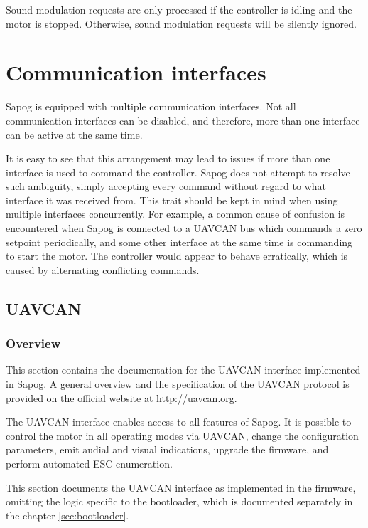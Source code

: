 \documentclass{zubaxdoc}
\begin{document}
Sound modulation requests are only processed if the controller is idling and the motor is stopped.
Otherwise, sound modulation requests will be silently ignored.

\chapter{Communication interfaces}\label{sec:communication_interfaces}

Sapog is equipped with multiple communication interfaces.
Not all communication interfaces can be disabled,
and therefore, more than one interface can be active at the same time.

It is easy to see that this arrangement may lead to issues if more than one
interface is used to command the controller.
Sapog does not attempt to resolve such ambiguity, simply accepting every command
without regard to what interface it was received from.
This trait should be kept in mind when using multiple interfaces concurrently.
For example, a common cause of confusion is encountered when Sapog is connected to a
UAVCAN bus which commands a zero setpoint periodically,
and some other interface at the same time is commanding to start the motor.
The controller would appear to behave erratically,
which is caused by alternating conflicting commands.

\section{UAVCAN}

\subsection{Overview}

This section contains the documentation for the UAVCAN interface implemented in Sapog.
A general overview and the specification of the UAVCAN protocol is provided on the official website at
\mbox{\url{http://uavcan.org}}.

The UAVCAN interface enables access to all features of Sapog.
It is possible to control the motor in all operating modes via UAVCAN,
change the configuration parameters, emit audial and visual indications,
upgrade the firmware, and perform automated ESC enumeration.

This section documents the UAVCAN interface as implemented in the firmware,
omitting the logic specific to the bootloader, which is documented separately in the chapter
\ref{sec:bootloader}.
\end{document}
